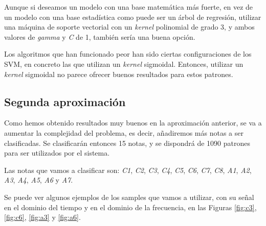 \documentclass[12pt]{article}
\begin{document}
\bigskip
Aunque si deseamos un modelo con una base matemática más fuerte, en vez de un modelo con una base estadística como puede ser un árbol de regresión,
utilizar una máquina de soporte vectorial con un \textit{kernel} polinomial de grado 3, y ambos valores de \textit{gamma} y \textit{C} de 1, también sería una buena opción. 

Los algoritmos que han funcionado peor han sido ciertas configuraciones de los SVM, en concreto las que utilizan un \textit{kernel} sigmoidal.
Entonces, utilizar un \textit{kernel} sigmoidal no parece ofrecer buenos resultados para estos patrones.

\newpage
\subsection{Segunda aproximación}
\label{Segunda aproximación}
Como hemos obtenido resultados muy buenos en la aproximación anterior, se va a aumentar la complejidad del problema,
es decir, añadiremos más notas a ser clasificadas. Se clasificarán entonces 15 notas, y se dispondrá de 
1090 patrones para ser utilizados por el sistema.

Las notas que vamos a clasificar son: \textit{C1}, \textit{C2}, \textit{C3}, \textit{C4}, \textit{C5}, \textit{C6}, \textit{C7}, \textit{C8}, \textit{A1}, \textit{A2}, \textit{A3}, \textit{A4}, \textit{A5}, \textit{A6} y \textit{A7}.

\bigskip
Se puede ver algunos ejemplos de los samples que vamos a utilizar, con su señal en el dominio del tiempo y en el
dominio de la frecuencia, en las Figuras \ref{fig:c3}, \ref{fig:c6}, \ref{fig:a3} y \ref{fig:a6}.
\end{document}
